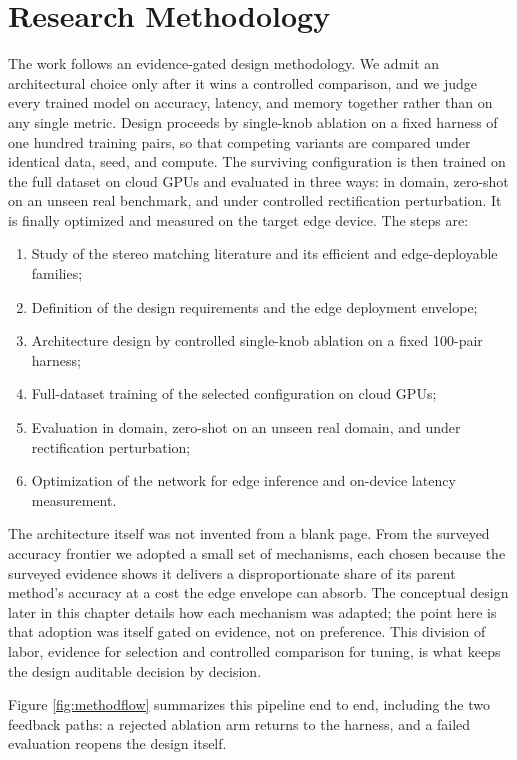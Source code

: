 \section{Research Methodology}
\label{sec:research_methodology}
The work follows an evidence-gated design methodology. We admit an
architectural choice only after it wins a controlled comparison, and we
judge every trained model on accuracy, latency, and memory together
rather than on any single metric. Design proceeds by single-knob
ablation on a fixed harness of one hundred training pairs, so that
competing variants are compared under identical data, seed, and compute.
The surviving configuration is then trained on the full dataset on cloud
GPUs and evaluated in three ways: in domain, zero-shot on an unseen real
benchmark, and under controlled rectification perturbation. It is finally
optimized and measured on the target edge device. The steps are:
\begin{enumerate}
\item Study of the stereo matching literature and its efficient and
edge-deployable families;
\item Definition of the design requirements and the edge deployment
envelope;
\item Architecture design by controlled single-knob ablation on a fixed
100-pair harness;
\item Full-dataset training of the selected configuration on cloud GPUs;
\item Evaluation in domain, zero-shot on an unseen real domain, and under
rectification perturbation;
\item Optimization of the network for edge inference and on-device
latency measurement.
\end{enumerate}

The architecture itself was not invented from a blank page. From the
surveyed accuracy frontier we adopted a small set of mechanisms, each
chosen because the surveyed evidence shows it delivers a disproportionate
share of its parent method's accuracy at a cost the edge envelope can
absorb. The conceptual design later in this chapter details how each
mechanism was adapted; the point here is that adoption was itself gated
on evidence, not on preference. This division of labor, evidence for
selection and controlled comparison for tuning, is what keeps the design
auditable decision by decision.

Figure \ref{fig:methodflow} summarizes this pipeline end to end,
including the two feedback paths: a rejected ablation arm returns to the
harness, and a failed evaluation reopens the design itself.

